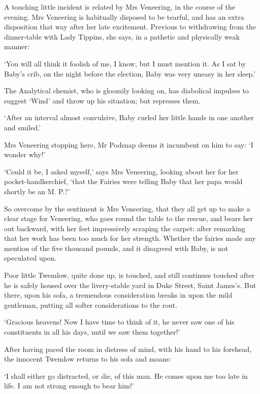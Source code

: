 A touching little incident is related by Mrs Veneering, in the course of
the evening. Mrs Veneering is habitually disposed to be tearful, and
has an extra disposition that way after her late excitement. Previous
to withdrawing from the dinner-table with Lady Tippins, she says, in a
pathetic and physically weak manner:

‘You will all think it foolish of me, I know, but I must mention it. As
I sat by Baby’s crib, on the night before the election, Baby was very
uneasy in her sleep.’

The Analytical chemist, who is gloomily looking on, has diabolical
impulses to suggest ‘Wind’ and throw up his situation; but represses
them.

‘After an interval almost convulsive, Baby curled her little hands in
one another and smiled.’

Mrs Veneering stopping here, Mr Podsnap deems it incumbent on him to
say: ‘I wonder why!’

‘Could it be, I asked myself,’ says Mrs Veneering, looking about her for
her pocket-handkerchief, ‘that the Fairies were telling Baby that her
papa would shortly be an M. P.?’

So overcome by the sentiment is Mrs Veneering, that they all get up
to make a clear stage for Veneering, who goes round the table to the
rescue, and bears her out backward, with her feet impressively scraping
the carpet: after remarking that her work has been too much for her
strength. Whether the fairies made any mention of the five thousand
pounds, and it disagreed with Baby, is not speculated upon.

Poor little Twemlow, quite done up, is touched, and still continues
touched after he is safely housed over the livery-stable yard in
Duke Street, Saint James’s. But there, upon his sofa, a tremendous
consideration breaks in upon the mild gentleman, putting all softer
considerations to the rout.

‘Gracious heavens! Now I have time to think of it, he never saw one of
his constituents in all his days, until we saw them together!’

After having paced the room in distress of mind, with his hand to his
forehead, the innocent Twemlow returns to his sofa and moans:

‘I shall either go distracted, or die, of this man. He comes upon me too
late in life. I am not strong enough to bear him!’



